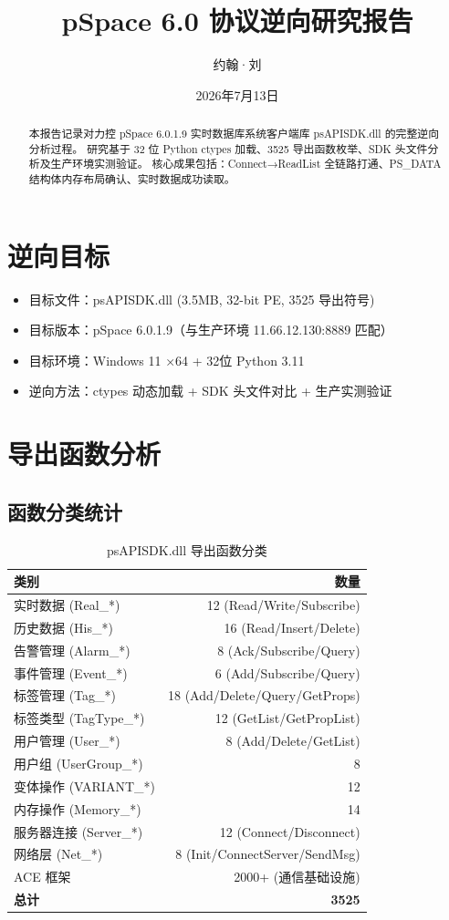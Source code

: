 \documentclass[12pt,a4paper]{ctexart}
\title{\textbf{pSpace 6.0 协议逆向研究报告}}
\author{约翰·刘}
\date{2026年7月13日}
\begin{document}
\maketitle
\begin{abstract}
本报告记录对力控 pSpace 6.0.1.9 实时数据库系统客户端库 psAPISDK.dll 的完整逆向分析过程。
研究基于 32 位 Python ctypes 加载、3525 导出函数枚举、SDK 头文件分析及生产环境实测验证。
核心成果包括：Connect→ReadList 全链路打通、PS\_DATA 结构体内存布局确认、实时数据成功读取。
\end{abstract}

\section{逆向目标}
\begin{itemize}[leftmargin=*]
  \item 目标文件：psAPISDK.dll (3.5MB, 32-bit PE, 3525 导出符号)
  \item 目标版本：pSpace 6.0.1.9（与生产环境 11.66.12.130:8889 匹配）
  \item 目标环境：Windows 11 ×64 + 32位 Python 3.11
  \item 逆向方法：ctypes 动态加载 + SDK 头文件对比 + 生产实测验证
\end{itemize}

\section{导出函数分析}

\subsection{函数分类统计}
\begin{table}[H]\centering
\caption{psAPISDK.dll 导出函数分类}
\begin{tabular}{lr}
\toprule
\textbf{类别} & \textbf{数量} \\
\midrule
实时数据 (Real\_*) & 12 (Read/Write/Subscribe) \\
历史数据 (His\_*) & 16 (Read/Insert/Delete) \\
告警管理 (Alarm\_*) & 8 (Ack/Subscribe/Query) \\
事件管理 (Event\_*) & 6 (Add/Subscribe/Query) \\
标签管理 (Tag\_*) & 18 (Add/Delete/Query/GetProps) \\
标签类型 (TagType\_*) & 12 (GetList/GetPropList) \\
用户管理 (User\_*) & 8 (Add/Delete/GetList) \\
用户组 (UserGroup\_*) & 8 \\
变体操作 (VARIANT\_*) & 12 \\
内存操作 (Memory\_*) & 14 \\
服务器连接 (Server\_*) & 12 (Connect/Disconnect) \\
网络层 (Net\_*) & 8 (Init/ConnectServer/SendMsg) \\
ACE 框架 & 2000+ (通信基础设施) \\
\textbf{总计} & \textbf{3525} \\
\bottomrule
\end{tabular}
\end{table}
\end{document}
